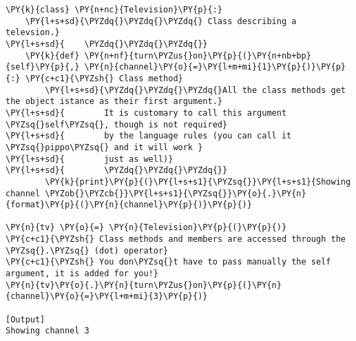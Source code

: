 \begin{Verbatim}[label=\makebox{\url{https://bitbucket.org/lbaldini/programming/src/tip/snippets/class\_methods.py}},commandchars=\\\{\}]
\PY{k}{class} \PY{n+nc}{Television}\PY{p}{:}
    \PY{l+s+sd}{\PYZdq{}\PYZdq{}\PYZdq{} Class describing a televsion.}
\PY{l+s+sd}{    \PYZdq{}\PYZdq{}\PYZdq{}}
    \PY{k}{def} \PY{n+nf}{turn\PYZus{}on}\PY{p}{(}\PY{n+nb+bp}{self}\PY{p}{,} \PY{n}{channel}\PY{o}{=}\PY{l+m+mi}{1}\PY{p}{)}\PY{p}{:} \PY{c+c1}{\PYZsh{} Class method}
        \PY{l+s+sd}{\PYZdq{}\PYZdq{}\PYZdq{}All the class methods get the object istance as their first argument.}
\PY{l+s+sd}{        It is customary to call this argument \PYZsq{}self\PYZsq{}, though is not required}
\PY{l+s+sd}{        by the language rules (you can call it \PYZsq{}pippo\PYZsq{} and it will work }
\PY{l+s+sd}{        just as well)}
\PY{l+s+sd}{        \PYZdq{}\PYZdq{}\PYZdq{}}
        \PY{k}{print}\PY{p}{(}\PY{l+s+s1}{\PYZsq{}}\PY{l+s+s1}{Showing channel \PYZob{}\PYZcb{}}\PY{l+s+s1}{\PYZsq{}}\PY{o}{.}\PY{n}{format}\PY{p}{(}\PY{n}{channel}\PY{p}{)}\PY{p}{)}

\PY{n}{tv} \PY{o}{=} \PY{n}{Television}\PY{p}{(}\PY{p}{)}
\PY{c+c1}{\PYZsh{} Class methods and members are accessed through the \PYZsq{}.\PYZsq{} (dot) operator}
\PY{c+c1}{\PYZsh{} You don\PYZsq{}t have to pass manually the self argument, it is added for you!}
\PY{n}{tv}\PY{o}{.}\PY{n}{turn\PYZus{}on}\PY{p}{(}\PY{n}{channel}\PY{o}{=}\PY{l+m+mi}{3}\PY{p}{)}

[Output]
Showing channel 3
\end{Verbatim}